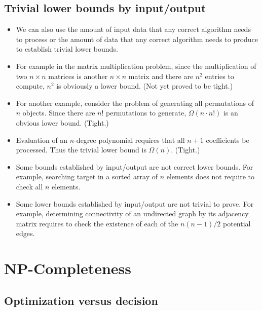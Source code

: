 \documentclass{article}
\begin{document}
\subsection{Trivial lower bounds by input/output}

\begin{itemize}

\item We can also use the amount of input data that any correct algorithm needs to process
or the amount of data that any  correct algorithm needs to produce to establish
trivial lower bounds.

\item For example in the matrix multiplication problem, since the
multiplication of two $n\times n$ matrices is another $n\times n$
matrix and there are $n^2$ entries to compute, $n^2$ is obviously
a lower bound. (Not yet proved to be tight.)

\item For another example, consider the problem of generating all permutations
of $n$ objects. Since there are $n!$ permutations to generate, $\Omega(n\cdot n!)$ is 
an obvious lower bound. (Tight.)

\item Evaluation of an $n$-degree polynomial requires that all $n+1$ coefficients be
processed. Thus the trivial lower bound is $\Omega(n)$. (Tight.)

\item Some bounds established by input/output are not correct lower bounds. 
For example, searching target in a sorted array of $n$ elements does not require to check 
all $n$ elements.

\item Some lower bounds established by input/output are not trivial to prove.
For example, determining connectivity of an undirected graph by its adjacency matrix
requires to check the existence of each of the $n(n-1)/2$ potential edges.

\end{itemize}

\newpage

\section{NP-Completeness}

\subsection{Optimization versus decision}
\end{document}
